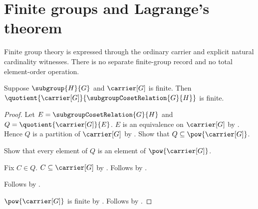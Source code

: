 




\section{Finite groups and Lagrange's theorem}

Finite group theory is expressed through the ordinary carrier and explicit
natural cardinality witnesses.  There is no separate finite-group record and
no total element-order operation.

\begin{proposition}\label{finite_subgroup_coset_quotient}
    Suppose $\subgroup{H}{G}$ and $\carrier[G]$ is finite.
    Then
        $\quotient{\carrier[G]}{\subgroupCosetRelation{G}{H}}$
        is finite.
\end{proposition}
\begin{proof}
    Let $E=\subgroupCosetRelation{G}{H}$ and
        $Q=\quotient{\carrier[G]}{E}$.
    $E$ is an equivalence on $\carrier[G]$ by
        .
    Hence $Q$ is a partition of $\carrier[G]$ by
        .
    Show that $Q\subseteq\pow{\carrier[G]}$.
    \begin{subproof}
        Show that every element of $Q$ is an element of
            $\pow{\carrier[G]}$.
        \begin{subproof}
            Fix $C\in Q$.
            $C\subseteq\carrier[G]$ by
                .
            Follows by .
        \end{subproof}
        Follows by .
    \end{subproof}
    $\pow{\carrier[G]}$ is finite by .
    Follows by .
\end{proof}

